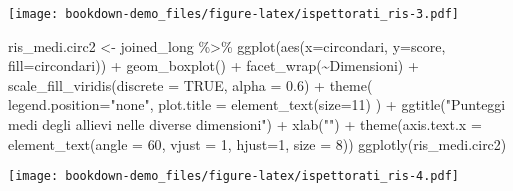 \documentclass[
]{book}
\newenvironment{Shaded}{\begin{snugshade}}{\end{snugshade}}
\newcommand{\AttributeTok}[1]{\textcolor[rgb]{0.77,0.63,0.00}{#1}}
\newcommand{\ConstantTok}[1]{\textcolor[rgb]{0.00,0.00,0.00}{#1}}
\newcommand{\DecValTok}[1]{\textcolor[rgb]{0.00,0.00,0.81}{#1}}
\newcommand{\FloatTok}[1]{\textcolor[rgb]{0.00,0.00,0.81}{#1}}
\newcommand{\FunctionTok}[1]{\textcolor[rgb]{0.00,0.00,0.00}{#1}}
\newcommand{\NormalTok}[1]{#1}
\newcommand{\OtherTok}[1]{\textcolor[rgb]{0.56,0.35,0.01}{#1}}
\newcommand{\SpecialCharTok}[1]{\textcolor[rgb]{0.00,0.00,0.00}{#1}}
\newcommand{\StringTok}[1]{\textcolor[rgb]{0.31,0.60,0.02}{#1}}
\begin{document}
\texttt{[image: bookdown-demo\_files/figure-latex/ispettorati\_ris-3.pdf]}

\begin{Shaded}
\begin{Highlighting}[]
\NormalTok{ris\_medi.circ2 }\OtherTok{\textless{}{-}}\NormalTok{ joined\_long }\SpecialCharTok{\%\textgreater{}\%}
  \FunctionTok{ggplot}\NormalTok{(}\FunctionTok{aes}\NormalTok{(}\AttributeTok{x=}\NormalTok{circondari, }\AttributeTok{y=}\NormalTok{score, }\AttributeTok{fill=}\NormalTok{circondari)) }\SpecialCharTok{+}
  \FunctionTok{geom\_boxplot}\NormalTok{() }\SpecialCharTok{+}
  \FunctionTok{facet\_wrap}\NormalTok{(}\SpecialCharTok{\textasciitilde{}}\NormalTok{Dimensioni) }\SpecialCharTok{+}
  \FunctionTok{scale\_fill\_viridis}\NormalTok{(}\AttributeTok{discrete =} \ConstantTok{TRUE}\NormalTok{, }\AttributeTok{alpha =} \FloatTok{0.6}\NormalTok{) }\SpecialCharTok{+}
  \FunctionTok{theme}\NormalTok{(}
    \AttributeTok{legend.position=}\StringTok{"none"}\NormalTok{,}
    \AttributeTok{plot.title =} \FunctionTok{element\_text}\NormalTok{(}\AttributeTok{size=}\DecValTok{11}\NormalTok{)}
\NormalTok{  ) }\SpecialCharTok{+}
  \FunctionTok{ggtitle}\NormalTok{(}\StringTok{"Punteggi medi degli allievi nelle diverse dimensioni"}\NormalTok{) }\SpecialCharTok{+}
  \FunctionTok{xlab}\NormalTok{(}\StringTok{""}\NormalTok{) }\SpecialCharTok{+}
  \FunctionTok{theme}\NormalTok{(}\AttributeTok{axis.text.x =} \FunctionTok{element\_text}\NormalTok{(}\AttributeTok{angle =} \DecValTok{60}\NormalTok{, }\AttributeTok{vjust =} \DecValTok{1}\NormalTok{, }\AttributeTok{hjust=}\DecValTok{1}\NormalTok{, }\AttributeTok{size =} \DecValTok{8}\NormalTok{))}
\FunctionTok{ggplotly}\NormalTok{(ris\_medi.circ2)}
\end{Highlighting}
\end{Shaded}

\texttt{[image: bookdown-demo\_files/figure-latex/ispettorati\_ris-4.pdf]}
\end{document}
